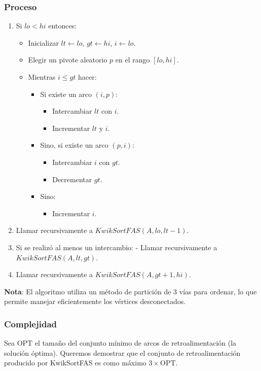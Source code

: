 \documentclass{article}
\begin{document}
\subsubsection{Proceso}
\begin{enumerate}


\item Si \(lo < hi\) entonces:
\begin{itemize}

   \item Inicializar \(lt \gets lo\), \(gt \gets hi\), \(i \gets lo\).
   \item Elegir un pivote aleatorio \(p\) en el rango \([lo, hi]\).
   \item Mientras \(i \leq gt\) hacer:
   \begin{itemize}
     \item Si existe un arco \((i, p)\):
  		\begin{itemize}
  		
       \item Intercambiar \(lt\) con \(i\).
       \item Incrementar \(lt\) y \(i\).
       \end{itemize}
     \item Sino, si existe un arco \((p, i)\):
     \begin{itemize}
       \item Intercambiar \(i\) con \(gt\).
       \item Decrementar \(gt\).
       \end{itemize}
     \item Sino:
     \begin{itemize}
       \item Incrementar \(i\).
       \end{itemize}
    \end{itemize}
\end{itemize}
\item Llamar recursivamente a \(KwikSortFAS(A, lo, lt - 1)\).
\item Si se realizó al menos un intercambio:
   - Llamar recursivamente a \(KwikSortFAS(A, lt, gt)\).
\item Llamar recursivamente a \(KwikSortFAS(A, gt + 1, hi)\).
\end{enumerate}
\textbf{Nota}: El algoritmo utiliza un método de partición de 3 vías para ordenar, lo que permite manejar eficientemente los vértices desconectados.
\subsubsection{Complejidad}
Sea \(\text{OPT}\) el tamaño del conjunto mínimo de arcos de retroalimentación (la solución óptima). Queremos demostrar que el conjunto de retroalimentación producido por KwikSortFAS es como máximo \(3 \times \text{OPT}\).
\end{document}
